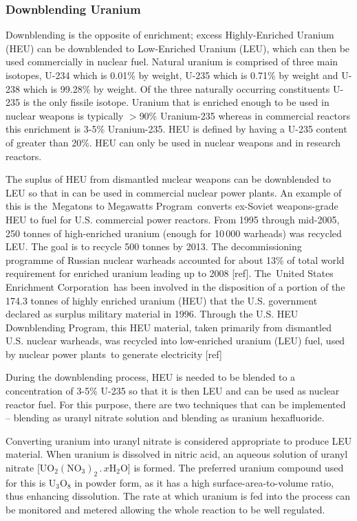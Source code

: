 \documentclass[twocolumn,a4paper]{article}
\begin{document}
\subsubsection{Downblending Uranium}
Downblending is the opposite of enrichment; excess Highly-Enriched Uranium (HEU) can 
be downblended to Low-Enriched Uranium (LEU), which can then be used commercially in 
nuclear fuel. Natural uranium is comprised of three main isotopes, U-234 which is 
0.01\% by weight, U-235 which is 0.71\% by weight and U-238 which is 99.28\% by weight. 
Of the three naturally occurring constituents U-235 is the only fissile isotope. 
Uranium that is enriched enough to be used in nuclear weapons is typically \(>\)90\% 
Uranium-235 whereas in commercial reactors this enrichment is 3-5\% Uranium-235. 
HEU is defined by having a U-235 content of greater than 20\%. HEU can only be used 
in nuclear weapons and in research reactors.

The suplus of HEU from dismantled nuclear weapons can be downblended to LEU so that 
in can be used in commercial nuclear power plants. An example of this is the Megatons 
to Megawatts Program converts ex-Soviet weapons-grade HEU to fuel for U.S. commercial 
power reactors. From 1995 through mid-2005, 250 tonnes of high-enriched uranium (enough 
for 10\,000 warheads) was recycled LEU. The goal is to recycle 500 tonnes by 2013. The 
decommissioning programme of Russian nuclear warheads accounted for about 13\% of total 
world requirement for enriched uranium leading up to 2008 
[ref]. The United States 
Enrichment Corporation has been involved in the disposition of a portion of the 
174.3 tonnes of highly enriched uranium (HEU) that the U.S. government declared as 
surplus military material in 1996. Through the U.S. HEU Downblending Program, this 
HEU material, taken primarily from dismantled U.S. nuclear warheads, was recycled into 
low-enriched uranium (LEU) fuel, used by nuclear power plants to generate electricity 
[ref]

During the downblending process, HEU is needed to be blended to a concentration of 3-5\% 
U-235 so that it is then LEU and can be used as nuclear reactor fuel. For this purpose, 
there are two techniques that can be implemented -- blending as uranyl nitrate solution 
and blending as uranium hexafluoride. 

Converting uranium into uranyl nitrate is considered appropriate to produce LEU material. 
When uranium is dissolved in nitric acid, an aqueous solution of uranyl nitrate 
[\(\mathrm{UO_2(NO_3)_2\,.\,}x\mathrm{H_2O}\)] is formed. The preferred uranium compound 
used for this is \(\mathrm{U_3O_8}\) in powder form, as it has a high 
surface-area-to-volume ratio, thus enhancing dissolution. The rate at which uranium is 
fed into the process can be monitored and metered allowing the whole reaction to be well 
regulated.
\end{document}
